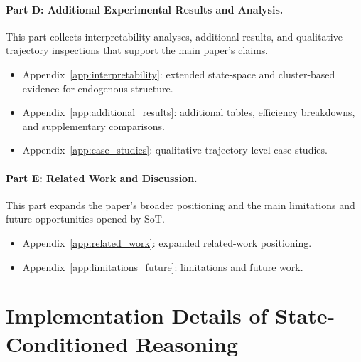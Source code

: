 \paragraph{Part D: Additional Experimental Results and Analysis.}
This part collects interpretability analyses, additional results, and qualitative trajectory inspections that support the main paper's claims.
\begin{itemize}[leftmargin=1.6em]
    \item Appendix~\ref{app:interpretability}: extended state-space and cluster-based evidence for endogenous structure.
    \item Appendix~\ref{app:additional_results}: additional tables, efficiency breakdowns, and supplementary comparisons.
    \item Appendix~\ref{app:case_studies}: qualitative trajectory-level case studies.
\end{itemize}

\paragraph{Part E: Related Work and Discussion.}
This part expands the paper's broader positioning and the main limitations and future opportunities opened by SoT.
\begin{itemize}[leftmargin=1.6em]
    \item Appendix~\ref{app:related_work}: expanded related-work positioning.
    \item Appendix~\ref{app:limitations_future}: limitations and future work.
\end{itemize}

\clearpage
\FloatBarrier
{}

\section{Implementation Details of State-Conditioned Reasoning}
\label{app:sot-details}

